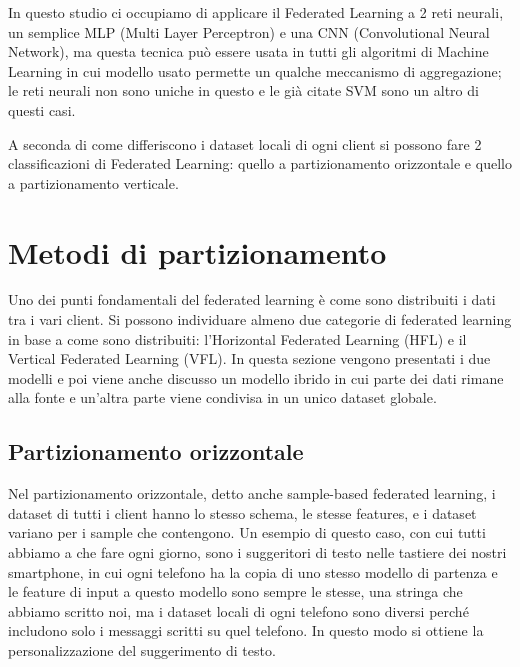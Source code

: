 In questo studio ci occupiamo di applicare il Federated Learning a 2 reti neurali,
un semplice MLP (Multi Layer Perceptron) e una CNN (Convolutional Neural Network),
ma questa tecnica può essere usata in tutti gli algoritmi di Machine Learning in 
cui modello usato permette un qualche meccanismo di aggregazione; le reti neurali
non sono uniche in questo e le già citate SVM sono un altro di questi casi.

A seconda di come differiscono i dataset locali di ogni client si possono
fare 2 classificazioni di Federated Learning: quello a partizionamento orizzontale
e quello a partizionamento verticale.

\section{Metodi di partizionamento}
Uno dei punti fondamentali del federated learning è come sono 
distribuiti i dati tra i vari client. Si possono individuare almeno due 
categorie di federated learning in base a come sono distribuiti: 
l'Horizontal Federated Learning (HFL) e il Vertical Federated Learning
(VFL). In questa sezione vengono presentati i due modelli e poi viene 
anche discusso un modello ibrido in cui parte dei dati rimane alla fonte 
e un'altra parte viene condivisa in un unico dataset globale.

\subsection{Partizionamento orizzontale}
Nel partizionamento orizzontale, detto anche sample-based federated 
learning, i dataset di tutti i client hanno lo
stesso schema, le stesse features, e i dataset variano per i sample
che contengono. Un esempio di questo caso, con cui tutti abbiamo a che 
fare ogni giorno, sono i suggeritori di testo nelle tastiere dei 
nostri smartphone, in cui ogni telefono ha la copia di uno stesso 
modello di partenza e le feature di input a questo modello sono sempre 
le stesse, una stringa che abbiamo scritto noi, ma i dataset locali 
di ogni telefono sono diversi perché includono solo i messaggi scritti 
su quel telefono. In questo modo si ottiene la personalizzazione del 
suggerimento di testo.


